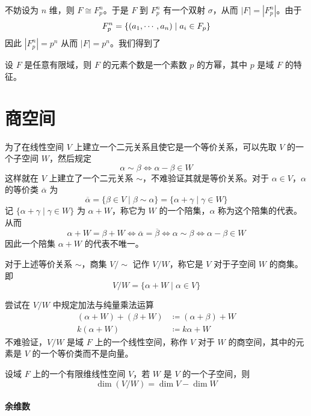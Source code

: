 不妨设为 $n$ 维，则 $F \cong F_p^n$。于是 $F$ 到 $F_p^n$ 有一个双射 $\sigma$，从而 $|F| = |F_p^n|$。由于
\[ F_p^n = \{ (a_1,\cdots,a_n) \mid a_i \in F_p \} \]
因此 $|F_p^n| = p^n$ 从而 $|F| = p^n$。我们得到了

\begin{theorem}
	设 $F$ 是任意有限域，则 $F$ 的元素个数是一个素数 $p$ 的方幂，其中 $p$ 是域 $F$ 的特征。
\end{theorem}

\section{商空间}

为了在线性空间 $V$ 上建立一个二元关系且使它是一个等价关系，可以先取 $V$ 的一个子空间 $W$，然后规定
\[ \alpha \sim \beta \Leftrightarrow \alpha - \beta \in W \]
这样就在 $V$ 上建立了一个二元关系 $\sim$，不难验证其就是等价关系。对于 $\alpha \in V$，$\alpha$ 的等价类 $\overline{\alpha}$ 为
\[ \overline{\alpha} = \{ \beta \in V \mid \beta \sim \alpha \} = \{ \alpha + \gamma \mid \gamma \in W \} \]
记 $\{ \alpha + \gamma \mid \gamma \in W \}$ 为 $\alpha + W$，称它为 $W$ 的一个陪集，$\alpha$ 称为这个陪集的代表。从而
\[ \alpha + W = \beta + W \Leftrightarrow \overline{\alpha} = \overline{\beta} \Leftrightarrow \alpha \sim \beta \Leftrightarrow \alpha - \beta \in W \]
因此一个陪集 $\alpha + W$ 的代表不唯一。

对于上述等价关系 $\sim$，商集 $V/\sim$ 记作 $V/W$，称它是 $V$ 对于子空间 $W$ 的商集。即
\[ V/W = \{ \alpha + W \mid \alpha \in V \} \]

尝试在 $V/W$ 中规定加法与纯量乘法运算
\[
	\begin{aligned}
		(\alpha + W) + (\beta + W) & \coloneqq (\alpha + \beta) + W \\
		k(\alpha + W)              & \coloneqq k\alpha + W
	\end{aligned}
\]
不难验证，$V/W$ 是域 $F$ 上的一个线性空间，称作 $V$ 对于 $W$ 的商空间，其中的元素是 $V$ 的一个等价类而不是向量。

\begin{theorem}
	设域 $F$ 上的一个有限维线性空间 $V$，若 $W$ 是 $V$ 的一个子空间，则
	\[ \dim(V/W) = \dim V - \dim W \]
\end{theorem}

\paragraph{余维数}

